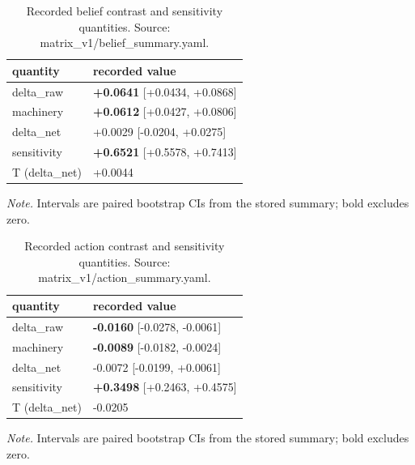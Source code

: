 \documentclass[10pt]{article}
\begin{document}
\begin{table}[!t]
\centering
\footnotesize
\caption{ Recorded belief contrast and sensitivity quantities. Source: matrix\_v1/belief\_summary.yaml. }

\begin{tabular}{ ll }
\toprule
quantity & recorded value \\
\midrule

delta\_raw & \textbf{+0.0641} [+0.0434, +0.0868] \\

machinery & \textbf{+0.0612} [+0.0427, +0.0806] \\

delta\_net & +0.0029 [-0.0204, +0.0275] \\

sensitivity & \textbf{+0.6521} [+0.5578, +0.7413] \\

T (delta\_net) & +0.0044 \\

\bottomrule
\end{tabular}

\par\footnotesize\emph{Note.} Intervals are paired bootstrap CIs from the stored summary; bold excludes zero.
\end{table}


\begin{table}[!t]
\centering
\footnotesize
\caption{ Recorded action contrast and sensitivity quantities. Source: matrix\_v1/action\_summary.yaml. }

\begin{tabular}{ ll }
\toprule
quantity & recorded value \\
\midrule

delta\_raw & \textbf{-0.0160} [-0.0278, -0.0061] \\

machinery & \textbf{-0.0089} [-0.0182, -0.0024] \\

delta\_net & -0.0072 [-0.0199, +0.0061] \\

sensitivity & \textbf{+0.3498} [+0.2463, +0.4575] \\

T (delta\_net) & -0.0205 \\

\bottomrule
\end{tabular}

\par\footnotesize\emph{Note.} Intervals are paired bootstrap CIs from the stored summary; bold excludes zero.
\end{table}
\end{document}
